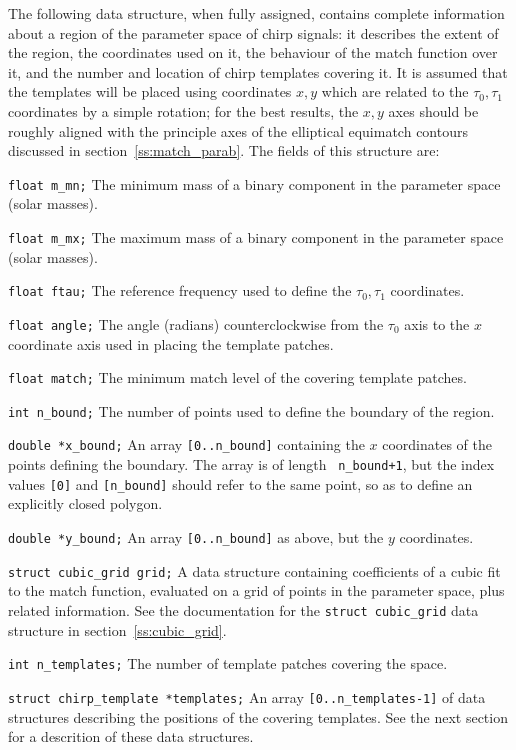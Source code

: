 The following data structure, when fully assigned, contains complete
information about a region of the parameter space of chirp signals: it
describes the extent of the region, the coordinates used on it, the
behaviour of the match function over it, and the number and location
of chirp templates covering it.  It is assumed that the templates will
be placed using coordinates $x,y$ which are related to the
$\tau_0,\tau_1$ coordinates by a simple rotation; for the best
results, the $x,y$ axes should be roughly aligned with the principle
axes of the elliptical equimatch contours discussed in
section~\ref{ss:match_parab}.  The fields of this structure are:

\begin{description}
\item{\tt float m\_mn;}
  The minimum mass of a binary component in the parameter space (solar
  masses).

\item{\tt float m\_mx;}
  The maximum mass of a binary component in the parameter space (solar
  masses).

\item{\tt float ftau;}
  The reference frequency used to define the $\tau_0,\tau_1$
  coordinates.

\item{\tt float angle;}
  The angle (radians) counterclockwise from the $\tau_0$ axis to the
  $x$ coordinate axis used in placing the template patches.

\item{\tt float match;}
  The minimum match level of the covering template patches.

\item{\tt int n\_bound;}
  The number of points used to define the boundary of the region.

\item{\tt double *x\_bound;}
  An array {\tt [0..n\_bound]} containing the $x$ coordinates of the
  points defining the boundary.  The array is of length {\tt
  n\_bound+1}, but the index values {\tt [0]} and {\tt [n\_bound]}
  should refer to the same point, so as to define an explicitly closed
  polygon.

\item{\tt double *y\_bound;}
  An array {\tt [0..n\_bound]} as above, but the $y$ coordinates.

\item{\tt struct cubic\_grid grid;}
  A data structure containing coefficients of a cubic fit to the match
  function, evaluated on a grid of points in the parameter space, plus
  related information.  See the documentation for the {\tt struct
  cubic\_grid} data structure in section~\ref{ss:cubic_grid}.

\item{\tt int n\_templates;}
  The number of template patches covering the space.

\item{\tt struct chirp\_template *templates;}
  An array {\tt [0..n\_templates-1]} of data structures describing the
  positions of the covering templates.  See the next section for a
  descrition of these data structures.

\end{description}
